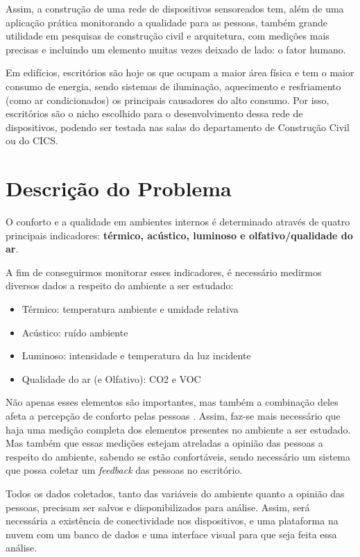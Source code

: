 \documentclass[]{politex}
\begin{document}
Assim, a construção de uma rede de dispositivos sensoreados tem, além de uma aplicação prática monitorando a qualidade para as pessoas, também grande utilidade em pesquisas de construção civil e arquitetura, com medições mais precisas e incluindo um elemento muitas vezes deixado de lado: o fator humano. 

Em edifícios, escritórios são hoje os que ocupam a maior área física e tem o maior consumo de energia, sendo sistemas de iluminação, aquecimento e resfriamento (como ar condicionados) os principais causadores do alto consumo\cite{EnergyBuildings}. Por isso, escritórios são o nicho escolhido para o desenvolvimento dessa rede de dispositivos, podendo ser testada nas salas do departamento de Construção Civil ou do CICS. 



\chapter{Descrição do Problema} %

O conforto e a qualidade em ambientes internos é determinado através de quatro principais indicadores: \textbf{térmico, acústico, luminoso e olfativo/qualidade do ar}\cite{ComfortBox}. 

A fim de conseguirmos monitorar esses indicadores, é necessário medirmos diversos dados a respeito do ambiente a ser estudado: %
\begin{itemize}
\item Térmico: temperatura ambiente e umidade relativa
\item Acústico: ruído ambiente
\item Luminoso: intensidade e temperatura da luz incidente
\item Qualidade do ar (e Olfativo): CO2 e VOC
\end{itemize}

Não apenas esses elementos são importantes, mas também a combinação deles afeta a percepção de conforto pelas pessoas \cite{ComfortOffice}. Assim, faz-se mais necessário que haja uma medição completa dos elementos presentes no ambiente a ser estudado. Mas também que essas medições estejam atreladas a opinião das pessoas a respeito do ambiente, sabendo se estão confortáveis, sendo necessário um sistema que possa coletar um \textit{feedback} das pessoas no escritório. 

Todos os dados coletados, tanto das variáveis do ambiente quanto a opinião das pessoas, precisam ser salvos e disponibilizados para análise. Assim, será necessária a existência de conectividade nos dispositivos, e uma plataforma na nuvem com um banco de dados e uma interface visual para que seja feita essa análise. 
\end{document}
